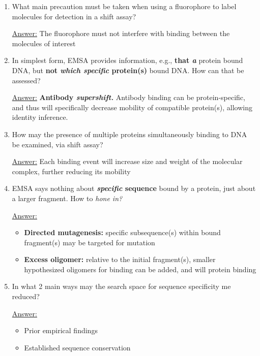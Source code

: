 \documentclass{article}
\newenvironment{QandA}{\begin{enumerate}[label=\bfseries Q\arabic*.]}
                       {\end{enumerate}}
\newenvironment{answered}{\par\normalfont\underline{Answer:}}{}
\begin{document}
\begin{QandA}
  \item{What main precaution must be taken when using a fluorophore to label molecules for detection in a shift assay?}
    \begin{answered}
    The fluorophore must not interfere with binding between the molecules of interest
    \end{answered}
  \item{In simplest form, EMSA provides information, e.g., \textbf{that \textit{a}} protein bound DNA, but \textbf{not \textit{which specific} protein(s)} bound DNA. How can that be assessed?}
    \begin{answered}
    \textbf{Antibody \textit{supershift.}} Antibody binding can be protein-specific, and thus will specifically decrease mobility of compatible protein(s), allowing identity inference.
    \end{answered}
  \item{How may the presence of multiple proteins simultaneously binding to DNA be examined, via shift assay?}
    \begin{answered}
    Each binding event will increase size and weight of the molecular complex, further reducing its mobility
    \end{answered}
  \item{EMSA says nothing about \textbf{\textit{specific} sequence} bound by a protein, just about a larger fragment. How to \textit{hone in?}}
    \begin{answered}
    \begin{itemize}
      \item{\textbf{Directed mutagenesis:} specific subsequence(s) within bound fragment(s) may be targeted for mutation}
      \item{\textbf{Excess oligomer:} relative to the initial fragment(s), smaller hypothesized oligomers for binding can be added, and will  protein binding}
    \end{itemize}
    \end{answered}
  \item{In what 2 main ways may the search space for sequence specificity me reduced?}
    \begin{answered}
    \begin{itemize}
      \item{Prior empirical findings}
      \item{Established sequence conservation}
    \end{itemize}
    \end{answered}

\end{QandA}
\end{document}
